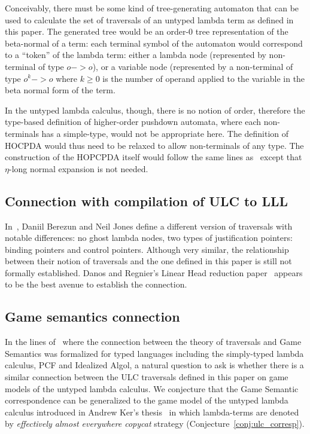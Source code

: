 \documentclass{article}
\theoremstyle{plain}
\theoremstyle{definition}
\theoremstyle{remark}
\begin{document}
Conceivably, there must be some kind of tree-generating automaton that can be used to calculate the set of traversals of an untyped lambda term as defined in this paper. The generated tree would be an order-$0$ tree representation of the beta-normal of a term: each terminal symbol of the automaton would correspond to a ``token'' of the lambda term: either a lambda node (represented by non-terminal of type $o->o$), or a variable node (represented by a non-terminal of type $o^k->o$ where $k\geq0$ is the number of operand applied to the variable in the beta normal form of the term.

In the untyped lambda calculus, though, there is no notion of order, therefore the type-based definition of higher-order pushdown automata, where each non-terminals has a simple-type, would not be appropriate here. The definition of HOCPDA would thus need to be relaxed to allow non-terminals of any type. The construction of the HOPCPDA itself would follow the same lines as~\cite{Ong2006} except that $\eta$-long normal expansion is not needed.

\subsection{Connection with compilation of ULC to LLL}

In~\cite{JonesBerezunLLL}, Daniil Berezun and Neil Jones define a different version of traversals with notable differences: no ghost lambda nodes, two types of justification pointers: binding pointers and control pointers. Although very similar, the relationship between their notion of traversals and the one defined in this paper is still not formally established. Danos and Regnier's Linear Head reduction paper~\cite{danos-head} appears to be the best avenue to establish the connection.


\subsection{Game semantics connection}

In the lines of~\cite{BlumPhd} where the connection between the theory of traversals and Game Semantics was formalized for typed languages including the simply-typed lambda calculus, PCF and Idealized Algol, a natural question to ask is whether there is a similar connection between the ULC traversals defined in this paper on game models of the untyped lambda calculus. We conjecture that the Game Semantic correspondence can be generalized to the game model of the untyped lambda calculus introduced in Andrew Ker's thesis~\cite{KerThesis} in which lambda-terms are denoted by \emph{effectively almost everywhere copycat} strategy  (Conjecture~\ref{conj:ulc_corresp}).
\end{document}
